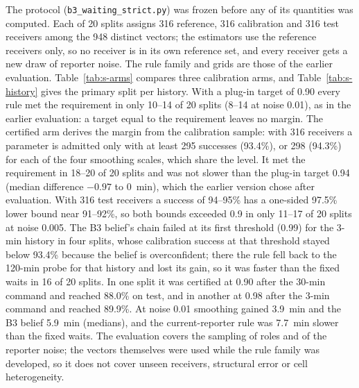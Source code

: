 \documentclass[conference]{IEEEtran}
\begin{document}
\begin{table}[t]
\caption{Calibration arms of the strict evaluation over 20 splits: splits meeting $q$ for both histories on test / splits whose one-sided 97.5\% bounds both exceed $q$; median $\Delta T$ against the same arm's fixed waits. $^*$Target chosen after the earlier evaluation.}
\label{tab:s-arms}
\centering\footnotesize\setlength{\tabcolsep}{2pt}

\end{table}

The protocol (\texttt{b3\_waiting\_strict.py}) was frozen before any of its quantities was computed. Each of 20 splits assigns 316 reference, 316 calibration and 316 test receivers among the 948 distinct vectors; the estimators use the reference receivers only, so no receiver is in its own reference set, and every receiver gets a new draw of reporter noise. The rule family and grids are those of the earlier evaluation. Table~\ref{tab:s-arms} compares three calibration arms, and Table~\ref{tab:s-history} gives the primary split per history. With a plug-in target of 0.90 every rule met the requirement in only 10--14 of 20 splits (8--14 at noise 0.01), as in the earlier evaluation: a target equal to the requirement leaves no margin. The certified arm derives the margin from the calibration sample: with 316 receivers a parameter is admitted only with at least 295 successes (93.4\%), or 298 (94.3\%) for each of the four smoothing scales, which share the level. It met the requirement in 18--20 of 20 splits and was not slower than the plug-in target 0.94 (median difference $-0.97$ to 0~min), which the earlier version chose after evaluation. With 316 test receivers a success of 94--95\% has a one-sided 97.5\% lower bound near 91--92\%, so both bounds exceeded 0.9 in only 11--17 of 20 splits at noise 0.005. The B3 belief's chain failed at its first threshold (0.99) for the 3-min history in four splits, whose calibration success at that threshold stayed below 93.4\% because the belief is overconfident; there the rule fell back to the 120-min probe for that history and lost its gain, so it was faster than the fixed waits in 16 of 20 splits. In one split it was certified at 0.90 after the 30-min command and reached 88.0\% on test, and in another at 0.98 after the 3-min command and reached 89.9\%. At noise 0.01 smoothing gained 3.9~min and the B3 belief 5.9~min (medians), and the current-reporter rule was 7.7~min slower than the fixed waits. The evaluation covers the sampling of roles and of the reporter noise; the vectors themselves were used while the rule family was developed, so it does not cover unseen receivers, structural error or cell heterogeneity.
\end{document}
